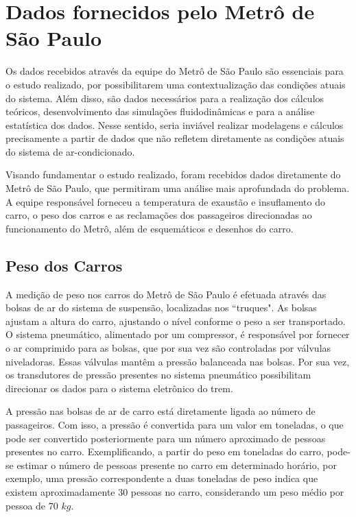 \documentclass[acronym,symbols,table]{fei}
\begin{document}
\section{Dados fornecidos pelo Metrô de São Paulo}

Os dados recebidos através da equipe do Metrô de São Paulo são essenciais para o estudo realizado, por possibilitarem uma contextualização das condições atuais do sistema. Além disso, são dados necessários para a realização dos cálculos teóricos, desenvolvimento das simulações fluidodinâmicas e para a análise estatística dos dados. Nesse sentido, seria inviável realizar modelagens e cálculos precisamente a partir de dados que não refletem diretamente as condições atuais do sistema de ar-condicionado.

Visando fundamentar o estudo realizado, foram recebidos dados diretamente do Metrô de São Paulo, que permitiram uma análise mais aprofundada do problema. A equipe responsável forneceu a temperatura de exaustão e insuflamento do carro, o peso dos carros e as reclamações dos passageiros direcionadas ao funcionamento do Metrô, além de esquemáticos e desenhos do carro. 

\subsection{Peso dos Carros} 

    A medição de peso nos carros do Metrô de São Paulo é efetuada através das bolsas de ar do sistema de suspensão, localizadas nos “truques". As bolsas ajustam a altura do carro, ajustando o nível conforme o peso a ser transportado. O sistema pneumático, alimentado por um compressor, é responsável por fornecer o ar comprimido para as bolsas, que por sua vez são controladas por válvulas niveladoras. Essas válvulas mantêm a pressão balanceada nas bolsas. Por sua vez, os transdutores de pressão presentes no sistema pneumático possibilitam direcionar os dados para o sistema eletrônico do trem.
    
    A pressão nas bolsas de ar de carro está diretamente ligada ao número de passageiros. Com isso, a pressão é convertida para um valor em toneladas, o que pode ser convertido posteriormente para um número aproximado de pessoas presentes no carro. Exemplificando, a partir do peso em toneladas do carro, pode-se estimar o número de pessoas presente no carro em determinado horário, por exemplo, uma pressão correspondente a duas toneladas de peso indica que existem aproximadamente 30 pessoas no carro, considerando um peso médio por pessoa de $70$ $kg$.
    
\end{document}
